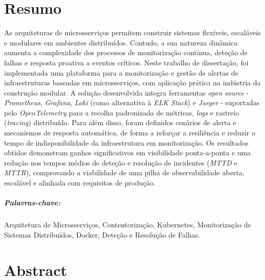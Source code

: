 \chapter*{Resumo}

As arquiteturas de microsserviços permitem construir sistemas flexíveis, escaláveis e modulares em ambientes distribuídos. Contudo, a sua natureza dinâmica aumenta a complexidade dos processos de monitorização contínua, deteção de falhas e resposta proativa a eventos críticos.
Neste trabalho de dissertação, foi implementada uma plataforma para a monitorização e gestão de alertas de infraestruturas baseadas em microsserviços, com aplicação prática na indústria da construção modular. A solução desenvolvida integra ferramentas \textit{open source} - \textit{Prometheus}, \textit{Grafana}, \textit{Loki} (como alternativa à \textit{ELK Stack}) e \textit{Jaeger} - suportadas pelo \textit{OpenTelemetry} para a recolha padronizada de métricas, \textit{logs} e rastreio (\textit{tracing}) distribuído.
Para além disso, foram definidos cenários de alerta e mecanismos de resposta automática, de forma a reforçar a resiliência e reduzir o tempo de indisponibilidade da infraestrutura em monitorização.
Os resultados obtidos demonstram ganhos significativos em visibilidade ponta-a-ponta e uma redução nos tempos médios de deteção e resolução de incidentes (\textit{MTTD} e \textit{MTTR}), comprovando a viabilidade de uma pilha de observabilidade aberta, escalável e alinhada com requisitos de produção.


\paragraph{Palavras-chave:} Arquitetura de Microsserviços, Contentorização, Kubernetes, Monitorização de Sistemas Distribuídos, Docker, Deteção e Resolução de Falhas.


\cleardoublepage

\chapter*{Abstract}

